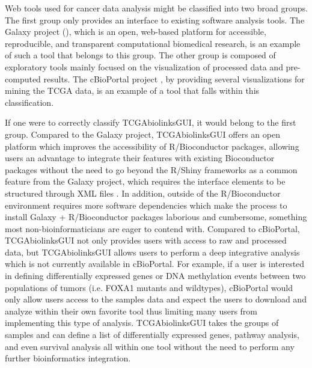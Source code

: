 Web tools used for cancer data analysis might be classified into two broad groups.
The first group only provides an interface to existing software analysis tools.
The Galaxy project (), which is an open, web-based platform for accessible, reproducible, and transparent computational biomedical research, is an example of such a tool that belongs to this group.
The other group is composed of exploratory tools mainly focused on the visualization of processed data and pre-computed results. The cBioPortal project \cite{gao2013integrative,cerami2012cbio}, by providing several visualizations for mining the TCGA data, is an example of a tool that falls within this classification.

If one were to correctly classify TCGAbiolinksGUI, it would belong to the first group. Compared to the Galaxy project, TCGAbiolinksGUI offers an open platform which improves the accessibility of R/Bioconductor packages, allowing users an advantage to integrate their features with existing Bioconductor packages without the need to go beyond the R/Shiny frameworks as a common feature from the Galaxy project, which requires the interface elements to be structured through XML files \cite{10.12688/f1000research.9821.1}.
In addition, outside of the R/Bioconductor environment requires more software dependencies which make the process to install Galaxy + R/Bioconductor packages laborious and cumbersome, something most non-bioinformaticians are eager to contend with.
Compared to cBioPortal, TCGAbiolinksGUI not only provides users with access to raw and processed data, but TCGAbiolinksGUI allows users to perform a deep integrative analysis which is not currently available in cBioPortal.  For example, if a user is interested in defining differentially expressed genes or DNA methylation events between two populations of tumors (i.e. FOXA1 mutants and wildtypes), cBioPortal would only allow users access to the samples data and expect the users to download and analyze within their own favorite tool thus limiting many users from implementing this type of analysis. TCGAbiolinksGUI takes the groups of samples and can define a list of differentially expressed genes, pathway analysis, and even survival analysis all within one tool without the need to perform any further bioinformatics integration.
